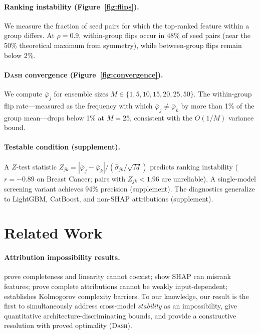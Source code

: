 \documentclass{article}
\newcommand{\DASH}{\textsc{Dash}}
\begin{document}
\paragraph{Ranking instability (Figure~\ref{fig:flips}).}
We measure the fraction of seed pairs for which the top-ranked feature within a group differs.
At $\rho = 0.9$, within-group flips occur in 48\% of seed pairs (near the 50\% theoretical maximum from symmetry), while between-group flips remain below 2\%.

\paragraph{\DASH{} convergence (Figure~\ref{fig:convergence}).}
We compute $\bar{\varphi}_j$ for ensemble sizes $M \in \{1, 5, 10, 15, 20, 25, 50\}$.
The within-group flip rate---measured as the frequency with which $\bar{\varphi}_j \neq \bar{\varphi}_k$ by more than 1\% of the group mean---drops below 1\% at $M = 25$, consistent with the $O(1/M)$ variance bound.

\paragraph{Testable condition (supplement).}
A $Z$-test statistic $Z_{jk} = |\bar\varphi_j - \bar\varphi_k| / (\hat\sigma_{jk}/\sqrt{M})$ predicts ranking instability ($r = -0.89$ on Breast Cancer; pairs with $Z_{jk} < 1.96$ are unreliable).
A single-model screening variant achieves 94\% precision (supplement).
The diagnostics generalize to LightGBM, CatBoost, and non-SHAP attributions (supplement).

\section{Related Work}
\label{sec:related}

\paragraph{Attribution impossibility results.}
\citet{bilodeau2024impossibility} prove completeness and linearity cannot coexist; \citet{huang2024failings} show SHAP can misrank features; \citet{srinivas2019full} prove complete attributions cannot be weakly input-dependent; \citet{rao2025limits} establishes Kolmogorov complexity barriers.
To our knowledge, our result is the first to simultaneously address cross-model \emph{stability} as an impossibility, give quantitative architecture-discriminating bounds, and provide a constructive resolution with proved optimality (\DASH{}).
\end{document}
